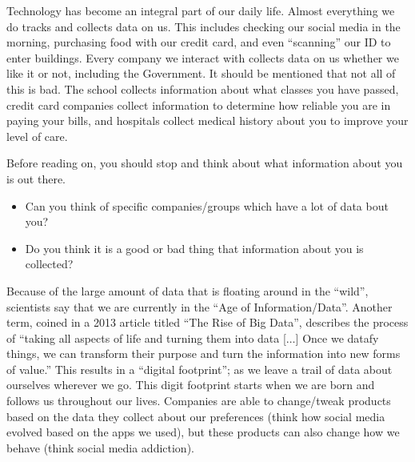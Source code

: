 \documentclass[
  letterpaper,
  DIV=11,
  numbers=noendperiod]{scrreprt}
\providecommand{\tightlist}{%
  \setlength{\itemsep}{0pt}\setlength{\parskip}{0pt}}
\begin{document}
Technology has become an integral part of our daily life. Almost
everything we do tracks and collects data on us. This includes checking
our social media in the morning, purchasing food with our credit card,
and even ``scanning'' our ID to enter buildings. Every company we
interact with collects data on us whether we like it or not, including
the Government. It should be mentioned that not all of this is bad. The
school collects information about what classes you have passed, credit
card companies collect information to determine how reliable you are in
paying your bills, and hospitals collect medical history about you to
improve your level of care.

\begin{tcolorbox}[enhanced jigsaw, colbacktitle=quarto-callout-note-color!10!white, breakable, bottomrule=.15mm, colframe=quarto-callout-note-color-frame, left=2mm, opacitybacktitle=0.6, title=\textcolor{quarto-callout-note-color}{\faInfo}\hspace{0.5em}{Reflection}, leftrule=.75mm, opacityback=0, rightrule=.15mm, titlerule=0mm, bottomtitle=1mm, colback=white, toprule=.15mm, arc=.35mm, toptitle=1mm, coltitle=black]

Before reading on, you should stop and think about what information
about you is out there.

\begin{itemize}
\tightlist
\item
  Can you think of specific companies/groups which have a lot of data
  bout you?
\item
  Do you think it is a good or bad thing that information about you is
  collected?
\end{itemize}

\end{tcolorbox}

Because of the large amount of data that is floating around in the
``wild'', scientists say that we are currently in the ``Age of
Information/Data''. Another term, coined in a 2013 article titled ``The
Rise of Big Data'', describes the process of ``taking all aspects of
life and turning them into data {[}\(\dots\){]} Once we datafy things,
we can transform their purpose and turn the information into new forms
of value.'' This results in a ``digital footprint''; as we leave a trail
of data about ourselves wherever we go. This digit footprint starts when
we are born and follows us throughout our lives. Companies are able to
change/tweak products based on the data they collect about our
preferences (think how social media evolved based on the apps we used),
but these products can also change how we behave (think social media
addiction).
\end{document}
